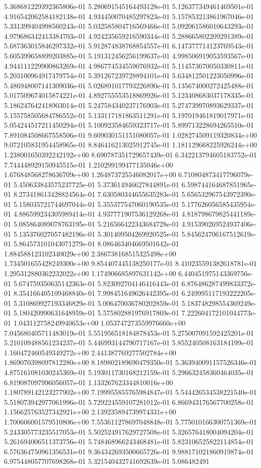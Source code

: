 5.368681229392365806e-01	5.280691545164493128e-01	5.126377349461469501e-01	4.916542062584182138e-01	4.934450070485297823e-01	5.157853213861967046e-01	5.331399404998560243e-01	5.032585804716569466e-01	5.092061586010643293e-01	4.979686342413384703e-01	4.924235659216590344e-01	5.288665802209291389e-01	5.687363015846297332e-01	5.912874838768854557e-01	6.147377714123769543e-01	5.605399658899203885e-01	5.191312456256199637e-01	4.998506919053593567e-01	4.944111229900863269e-01	4.986774534559076932e-01	5.114573670050330811e-01	5.203100964917479754e-01	5.391267239728894101e-01	5.634812501223050996e-01	5.486948007141309036e-01	5.026891017793226890e-01	5.135674000272425488e-01	5.017509674015874221e-01	4.892755553518869926e-01	5.123408683037178335e-01	5.186247642418903014e-01	5.247584340237176903e-01	5.274739970893629337e-01	5.155758505684786552e-01	5.133117181863511291e-01	5.197019461819017971e-01	5.054244517211450294e-01	5.100923584659323717e-01	5.899713228694265510e-01	7.891084508667558506e-01	9.609030151151080057e-01	1.028274509119320834e+00	9.072105831954458965e-01	8.846416213025912745e-01	1.181129668225926244e+00	1.238001650392242192e+00	8.690787351729657439e-01	6.342213794605183752e-01	7.744448929150945515e-01	1.210299199477135046e+00	1.676848568278636709e+00	1.264873725546082017e+00	6.710804873417796079e-01	5.450633843575237725e-01	5.373614946627844891e-01	6.598744164687851965e-01	8.273418613428824564e-01	7.630580344655635283e-01	5.656532967543972390e-01	5.158035721744697044e-01	5.355377547060190535e-01	5.177626056585435954e-01	4.886599234305989414e-01	4.937771907536129268e-01	4.818798679825441189e-01	5.085864089078763195e-01	5.216566422343684728e-01	4.915390269524937406e-01	5.135376027057482196e-01	5.301409504269920525e-01	5.845624706167512619e-01	5.864573101043071279e-01	8.086463404669501642e-01	1.884588123102340029e+00	2.386738168515325498e+00	1.734501655428249300e+00	9.854407445138250177e-01	8.410235591382618781e-01	1.295312880362232022e+00	1.174906685897631142e+00	6.440451975143369756e-01	5.674759350635142363e-01	5.823092704146416443e-01	6.876486287499833372e-01	8.354166405109468840e-01	7.998451649626442395e-01	6.249995117193222205e-01	5.310869927193346829e-01	5.006470036780202859e-01	5.183748298554369249e-01	5.180420990631648959e-01	5.575802881976917869e-01	7.222604172101044773e-01	1.043112758249940653e+00	1.053747273559976660e+00	7.045680405711483019e-01	5.551956518184878453e-01	5.275007091592425201e-01	5.210109488561234237e-01	5.446993144790717167e-01	5.855240508163184199e-01	1.160472460549349272e+00	2.441387769277502784e+00	1.869070398097812280e+00	8.189802189690479350e-01	5.363940091157526346e-01	4.875161081030245369e-01	5.193011730168212159e-01	5.296632458360464035e-01	6.819087097996056057e-01	1.133267623344810016e+00	1.180789142123277902e+00	7.199955855765984847e-01	5.544426534538221540e-01	5.518073942977061996e-01	5.729224559107281012e-01	6.866943176567700258e-01	1.156625763527342921e+00	2.139235894739974331e+00	1.700606001579510806e+00	7.553611278697048848e-01	5.775010166300751369e-01	5.243305773235517053e-01	5.502524917629727508e-01	5.326576418004094204e-01	5.261694006511373756e-01	5.748468966243468481e-01	5.823106525822114854e-01	6.576364750961356531e-01	9.364342693500665726e-01	9.988171021860919874e-01	6.975448057707698268e-01	5.321540432741692639e-01	5.086482491